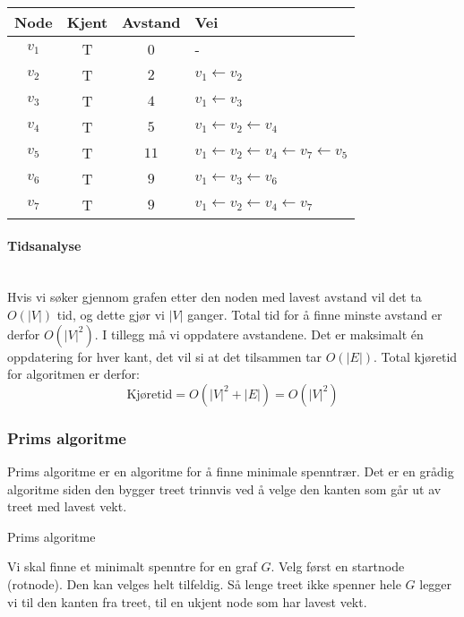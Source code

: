 \begin{eks}
\begin{center}
\begin{tabular}{c | c | c | l}
	 Node   & Kjent & Avstand & Vei                                                                 \\ \hline
	$ v_1 $ & T     & 0       & -                                                                   \\
	$ v_2 $ & T     & $ 2 $   & $ v_1 \leftarrow v_2 $                                              \\
	$ v_3 $ & T     & $ 4 $   & $ v_1 \leftarrow v_3 $                                              \\
	$ v_4 $ & T     & $ 5 $   & $ v_1 \leftarrow v_2 \leftarrow v_4 $                               \\
	$ v_5 $ & T     & $ 11 $  & $ v_1 \leftarrow v_2 \leftarrow v_4 \leftarrow v_7 \leftarrow v_5 $ \\
	$ v_6 $ & T     & $ 9 $   & $ v_1 \leftarrow v_3 \leftarrow v_6 $                               \\
	$ v_7 $ & T     & $ 9 $   & $ v_1 \leftarrow v_2 \leftarrow v_4 \leftarrow v_7 $
\end{tabular}
\end{center}
\end{eks}

\paragraph{Tidsanalyse}~\\
Hvis vi søker gjennom grafen etter den noden med lavest avstand vil det ta $ O(|V|) $ tid, og dette gjør vi $ |V| $ ganger. Total tid for å finne minste avstand er derfor $ O(|V|^2) $. I tillegg må vi oppdatere avstandene. Det er maksimalt én oppdatering for hver kant, det vil si at det tilsammen tar $ O(|E|) $. Total kjøretid for algoritmen er derfor:
\[ \text{Kjøretid} = O\left(|V|^2 + |E|\right) = O\left(|V|^2\right) \]

\subsubsection{Prims algoritme}
\label{prim}

Prims algoritme er en algoritme for å finne minimale spenntrær. Det er en grådig algoritme siden den bygger treet trinnvis ved å velge den kanten som går ut av treet med lavest vekt. 

\begin{teorem} Prims algoritme

Vi skal finne et minimalt spenntre for en graf $ G $. Velg først en startnode (rotnode). Den kan velges helt tilfeldig. Så lenge treet ikke spenner hele $ G $ legger vi til den kanten fra treet, til en ukjent node som har lavest vekt.
\end{teorem}

